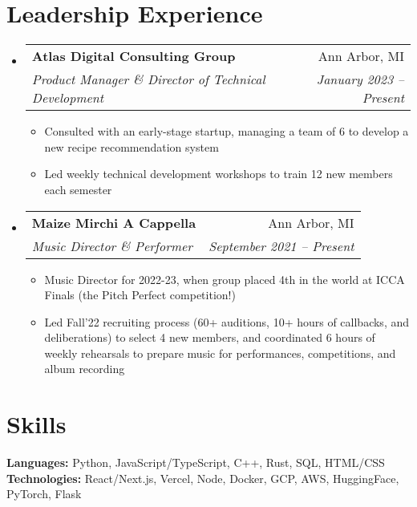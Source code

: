 \documentclass[letterpaper,11pt]{article}
\makeatletter
\newcommand{\resumeItem}[1]{
  \item\small{
    {#1 \vspace{-2pt}}
  }
}
\newcommand{\resumeSubheading}[4]{
  \vspace{-2pt}\item
    \begin{tabular*}{\textwidth}[t]{l@{\extracolsep{\fill}}r}
      \textbf{#1} & #2 \\
      \textit{\small#3} & \textit{\small #4} \\
    \end{tabular*}\vspace{-7pt}
}
\newcommand{\resumeProjectHeading}[2]{
    \item
    \begin{tabular*}{\textwidth}{l@{\extracolsep{\fill}}r}
      \small#1 & #2 \\
    \end{tabular*}\vspace{-7pt}
}
\newcommand{\resumeSubHeadingListStart}{\begin{itemize}[leftmargin=0in, label={}]}
\newcommand{\resumeSubHeadingListEnd}{\end{itemize}}
\newcommand{\resumeItemListStart}{\begin{itemize}[leftmargin=0.25in]}
\newcommand{\resumeItemListEnd}{\end{itemize}\vspace{-5pt}}
\newcommand{\mytexttilde}{\raisebox{0.5ex}{\texttildelow}}
\makeatother
\begin{document}
\section{Leadership Experience}
  \resumeSubHeadingListStart
    \resumeSubheading
      {Atlas Digital Consulting Group}{Ann Arbor, MI}
      {Product Manager \& Director of Technical Development}{January 2023 -- Present}
      \resumeItemListStart
        \resumeItem{Consulted with an early-stage startup, managing a team of 6 to develop a new recipe recommendation system}
        \resumeItem{Led weekly technical development workshops to train \mytexttilde 12 new members each semester}
    \resumeItemListEnd
  
    \resumeSubheading
      {Maize Mirchi A Cappella}{Ann Arbor, MI}
      {Music Director \& Performer}{September 2021 -- Present}
      \resumeItemListStart
        \resumeItem{Music Director for 2022-23, when group placed 4th in the world at ICCA Finals (the Pitch Perfect competition!)}
        \resumeItem{Led Fall’22 recruiting process (60+ auditions, 10+ hours of callbacks, and deliberations) to select 4 new members, and coordinated 6 hours of weekly rehearsals to prepare music for performances, competitions, and album recording}
      \resumeItemListEnd
  \resumeSubHeadingListEnd
  

\section{Skills}
 \begin{itemize}[leftmargin=0.15in, label={}]
    \small{\item{
     \textbf{Languages: }{Python, JavaScript/TypeScript, C++, Rust, SQL, HTML/CSS} \\
     \textbf{Technologies: }{React/Next.js, Vercel, Node, Docker, GCP, AWS, HuggingFace, PyTorch, Flask} \\
    }}
 \end{itemize}

\end{document}
